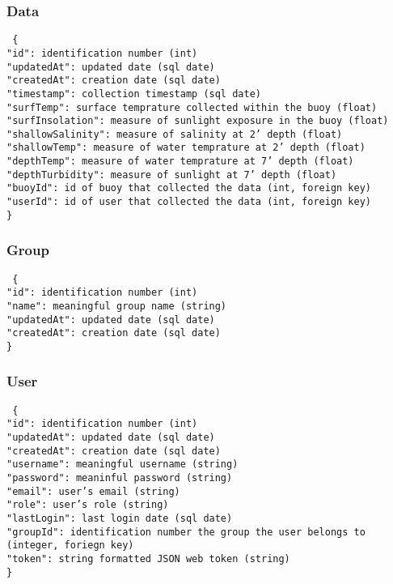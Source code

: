\subsubsection{Data}
\texttt{
\{ \\
    "id": identification number (int) \\
    "updatedAt": updated date (sql date) \\
    "createdAt": creation date (sql date) \\
    "timestamp": collection timestamp (sql date) \\
    "surfTemp": surface temprature collected within the buoy (float) \\
    "surfInsolation": measure of sunlight exposure in the buoy (float) \\
    "shallowSalinity": measure of salinity at 2' depth (float) \\
    "shallowTemp": measure of water temprature at 2' depth (float) \\
    "depthTemp": measure of water temprature at 7' depth (float) \\
    "depthTurbidity": measure of sunlight at 7' depth (float) \\
    "buoyId": id of buoy that collected the data (int, foreign key) \\
    "userId": id of user that collected the data (int, foreign key) \\
\}
}
\subsubsection{Group}
\texttt{
\{ \\
    "id": identification number (int) \\
    "name": meaningful group name (string) \\
    "updatedAt": updated date (sql date) \\
    "createdAt": creation date (sql date) \\
\}
}
\subsubsection{User}
\texttt{
\{ \\
    "id": identification number (int) \\
    "updatedAt": updated date (sql date) \\
    "createdAt": creation date (sql date) \\
    "username": meaningful username (string) \\
    "password": meaninful password (string) \\
    "email": user's email (string) \\
    "role":  user's role (string) \\
    "lastLogin": last login date (sql date) \\
    "groupId": identification number the group the user belongs to (integer, foriegn key) \\
    "token": string formatted JSON web token (string) \\
\}
}
